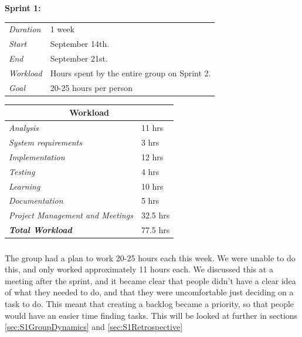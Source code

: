 \begin{minipage}{\linewidth}
\centering
\setlength{\tabcolsep}{22pt}
\textbf{Sprint 1:} 
\smallskip
{}
\begin{tabular}{ |l l| }
	\hline
	\it{Duration} & 1 week \\
	\it{Start} & September 14th. \\
	\it{End} & September 21st. \\
	\it{Workload} & Hours spent by the entire group on Sprint 2. \\
	\it{Goal} & 20-25 hours per person \\
	\hline
\end{tabular}
\end{minipage}
%
\bigskip
%
\begin{minipage}{\linewidth}
\setlength{\tabcolsep}{25pt}
\centering
{}
\begin{tabular}{ |l|l| }
	\hline
	\multicolumn{2}{|c|}{\cellcolor{gray!25} Workload} \\
	\hline
	\it{Analysis} & 11 hrs\\
	\it{System requirements} & 3 hrs\\
	\it{Implementation} & 12 hrs\\
	\it{Testing} & 4 hrs\\
	\it{Learning} & 10 hrs\\
	\it{Documentation} & 5 hrs\\
	\it{Project Management and Meetings} & 32.5 hrs\\
	\hline
	\textbf{\textit{Total Workload}} & 77.5 hrs\\
	\hline
\end{tabular}
\end{minipage}

\bigskip

\subparagraph{} The group had a plan to work 20-25 hours each this week. We were unable to do this, and only worked approximately 11 hours each. We discussed this at a meeting after the sprint, and it became clear that people didn't have a clear idea of what they needed to do, and that they were uncomfortable just deciding on a task to do. This meant that creating a backlog became a priority, so that people would have an easier time finding tasks. This will be looked at further in sections \ref{sec:S1GroupDynamics} and \ref{sec:S1Retrospective}

